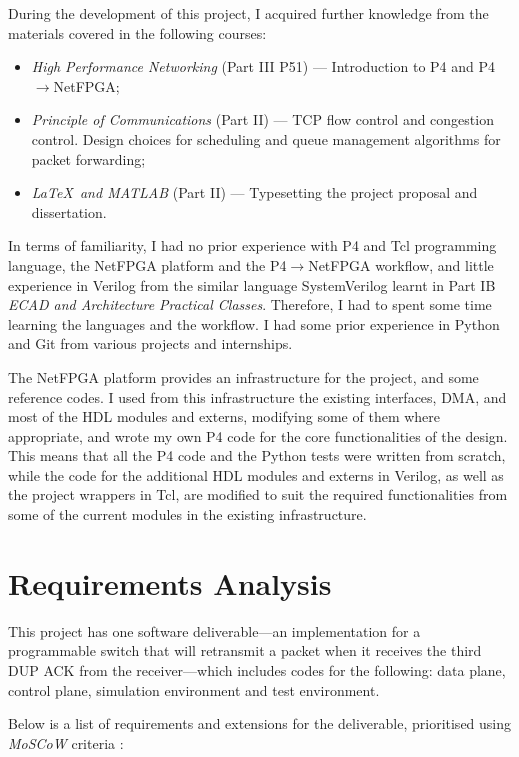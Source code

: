 During the development of this project, I acquired further knowledge from the materials covered in the following courses:%
\begin{itemize}
	\item \textit{High Performance Networking} (Part III P51) --- Introduction to P4 and P4$\rightarrow$NetFPGA;%
	\item \textit{Principle of Communications} (Part II) --- TCP flow control and congestion control. Design choices for scheduling and queue management algorithms for packet forwarding;%
	\item \textit{\LaTeX \ and MATLAB} (Part II) --- Typesetting the project proposal and dissertation.%
\end{itemize}

In terms of familiarity, I had no prior experience with P4 and Tcl programming language, the NetFPGA platform and the P4$\rightarrow$NetFPGA workflow, and little experience in Verilog from the similar language SystemVerilog learnt in Part IB \textit{ECAD and Architecture Practical Classes}. Therefore, I had to spent some time learning the languages and the workflow. I had some prior experience in Python and Git from various projects and internships.

The NetFPGA platform provides an infrastructure for the project, and some reference codes. I used from this infrastructure the existing interfaces, DMA, and most of the HDL modules and externs, modifying some of them where appropriate, and wrote my own P4 code for the core functionalities of the design. This means that all the P4 code and the Python tests were written from scratch, while the code for the additional HDL modules and externs in Verilog, as well as the project wrappers in Tcl, are modified to suit the required functionalities from some of the current modules in the existing infrastructure.

\section{Requirements Analysis}
This project has one software deliverable---an implementation for a programmable switch that will retransmit a packet when it receives the third DUP ACK from the receiver---which includes codes for the following: data plane, control plane, simulation environment and test environment.

Below is a list of requirements and extensions for the deliverable, prioritised using \textit{MoSCoW} criteria \cite{moscow}:

